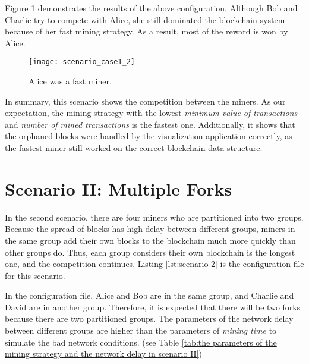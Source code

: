 Figure \ref{fig:alice was a fast miner} demonstrates the results of the above configuration. Although Bob and Charlie try to compete with Alice, she still dominated the blockchain system because of her fast mining strategy. As a result, most of the reward is won by Alice. 

\begin{figure}[htb]
    \centering
    \texttt{[image: scenario\_case1\_2]}
    \caption{Alice was a fast miner.}
    \label{fig:alice was a fast miner}
\end{figure}

\clearpage

In summary, this scenario shows the competition between the miners. As our expectation, the mining strategy with the lowest \textit{minimum value of transactions} and \textit{number of mined transactions} is the fastest one. Additionally, it shows that the orphaned blocks were handled by the visualization application correctly, as the fastest miner still worked on the correct blockchain data structure.

\section{Scenario II: Multiple Forks}

In the second scenario, there are four miners who are partitioned into two groups. Because the spread of blocks has high delay between different groups, miners in the same group add their own blocks to the blockchain much more quickly than other groups do. Thus, each group considers their own blockchain is the longest one, and the competition continues. Listing \ref{lst:scenario 2} is the configuration file for this scenario. 

In the configuration file, Alice and Bob are in the same group, and Charlie and David are in another group. Therefore, it is expected that there will be two forks because there are two partitioned groups. The parameters of the network delay between different groups are higher than the parameters of \textit{mining time} to simulate the bad network conditions. (see Table \ref{tab:the parameters of the mining strategy and the network delay in scenario II})

